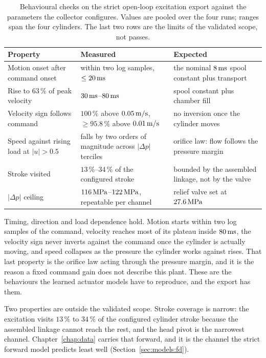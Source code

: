 \begin{table}[htbp]
  \centering
  \caption{Behavioural checks on the strict open-loop excitation export against
  the parameters the collector configures. Values are pooled over the four runs;
  ranges span the four cylinders. The last two rows are the limits of the
  validated scope, not passes.}
  \label{tab:sys:simscape-checks}
  \small
  \setlength{\tabcolsep}{4pt}
  \begin{tabular}{@{}p{}p{}p{}@{}}
    \toprule
    Property & Measured & Expected \\
    \midrule
    Motion onset after command onset
      & within two log samples, $\leq\unit[20]{ms}$
      & the nominal $\unit[8]{ms}$ spool constant plus transport \\
    Rise to $63\,\%$ of peak velocity
      & $\unit[30]{ms}$--$\unit[80]{ms}$
      & spool constant plus chamber fill \\
    Velocity sign follows command
      & $100\,\%$ above $\unit[0.05]{m/s}$, $\geq 95.8\,\%$ above
        $\unit[0.01]{m/s}$
      & no inversion once the cylinder moves \\
    Speed against rising load at $|u|>0.5$
      & falls by two orders of magnitude across $|\Delta p|$ terciles
      & orifice law: flow follows the pressure margin \\
    \midrule
    Stroke visited
      & $13\,\%$--$34\,\%$ of the configured stroke
      & bounded by the assembled linkage, not by the valve \\
    $|\Delta p|$ ceiling
      & $\unit[116]{MPa}$--$\unit[122]{MPa}$, repeatable per channel
      & relief valve set at $\unit[27.6]{MPa}$ \\
    \bottomrule
  \end{tabular}
\end{table}

Timing, direction and load dependence hold. Motion starts within two log
samples of the command, velocity reaches most of its plateau inside
$\unit[80]{ms}$, the velocity sign never inverts against the command once the
cylinder is actually moving, and speed collapses as the pressure the cylinder
works against rises. That last property is the orifice law acting through the
pressure margin, and it is the reason a fixed command gain does not describe
this plant. These are the behaviours the learned actuator models have to
reproduce, and the export has them.

Two properties are outside the validated scope. Stroke coverage is narrow: the
excitation visits $13\,\%$ to $34\,\%$ of the configured cylinder stroke because
the assembled linkage cannot reach the rest, and the head pivot is the narrowest
channel. Chapter~\ref{chap:data} carries that forward, and it is the channel the
strict forward model predicts least well (Section~\ref{sec:models:fd}).

